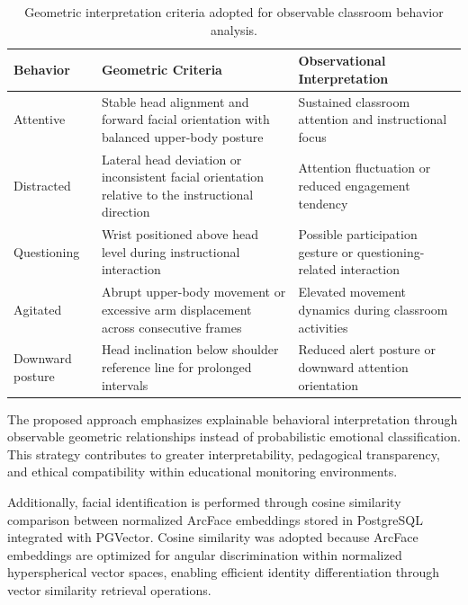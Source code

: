 \documentclass[12pt,a4paper]{article}
\begin{document}
\begin{table}[htbp]
\centering
\caption{Geometric interpretation criteria adopted for observable classroom behavior analysis.}
\label{tab:behavior_rules}
\begin{tabularx}{\textwidth}{>{\raggedright\arraybackslash}p{2.8cm} Y Y}
\toprule
\textbf{Behavior} & \textbf{Geometric Criteria} & \textbf{Observational Interpretation} \\
\midrule

Attentive &
Stable head alignment and forward facial orientation with balanced upper-body posture &
Sustained classroom attention and instructional focus \\

Distracted &
Lateral head deviation or inconsistent facial orientation relative to the instructional direction &
Attention fluctuation or reduced engagement tendency \\

Questioning &
Wrist positioned above head level during instructional interaction &
Possible participation gesture or questioning-related interaction \\

Agitated &
Abrupt upper-body movement or excessive arm displacement across consecutive frames &
Elevated movement dynamics during classroom activities \\

Downward posture &
Head inclination below shoulder reference line for prolonged intervals &
Reduced alert posture or downward attention orientation \\

\bottomrule
\end{tabularx}
\end{table}

The proposed approach emphasizes explainable behavioral interpretation through observable geometric relationships instead of probabilistic emotional classification. This strategy contributes to greater interpretability, pedagogical transparency, and ethical compatibility within educational monitoring environments.

Additionally, facial identification is performed through cosine similarity comparison between normalized ArcFace embeddings stored in PostgreSQL integrated with PGVector. Cosine similarity was adopted because ArcFace embeddings are optimized for angular discrimination within normalized hyperspherical vector spaces, enabling efficient identity differentiation through vector similarity retrieval operations.
\end{document}
